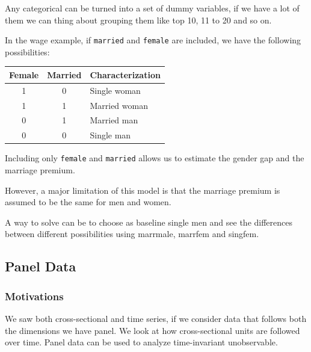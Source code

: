Any categorical can be turned into a set of dummy variables, if we have a lot of them we can thing about grouping them like top 10, 11 to 20 and so on.

In the wage example, if \texttt{married} and \texttt{female} are included, we have the following possibilities:

\vspace{5pt}

\begin{center}
\begin{tabular}{|c|c|l|}
    \hline
    Female & Married & Characterization \\
    \hline
    1 & 0 & Single woman \\
    1 & 1 & Married woman \\
    0 & 1 & Married man \\
    0 & 0 & Single man \\
    \hline
\end{tabular}
\end{center}

\vspace{10pt}

Including only \texttt{female} and \texttt{married} allows us to estimate the gender gap and the marriage premium.

\vspace{5pt}

However, a major limitation of this model is that the marriage premium is assumed to be the same for men and women.

\vspace{10pt}

A way to solve can be to choose as baseline single men and see the differences between different possibilities using marrmale, marrfem and singfem.


\subsection{Panel Data}


\subsubsection{Motivations}

We saw both cross-sectional and time series, if we consider data that follows both the dimensions we have panel. We look at how cross-sectional units are followed over time. Panel data can be used to analyze time-invariant unobservable. 

